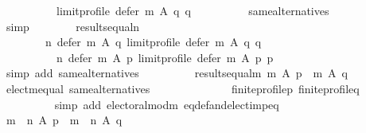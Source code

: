 \begin{isabellebody}
\ \ \ \ \ \ \ \ \ \ limit{\isacharunderscore}{\kern0pt}profile\ {\isacharparenleft}{\kern0pt}defer\ m\ A\ q{\isacharparenright}{\kern0pt}\ q{\isachardoublequoteclose}\isanewline
\ \ \ \ \ \ \ \ \isamarkupfalse%
\ same{\isacharunderscore}{\kern0pt}alternatives\isanewline
\ \ \ \ \ \ \ \ \isamarkupfalse%
\ simp\isanewline
\ \ \ \ \ \ \isamarkupfalse%
\ results{\isacharunderscore}{\kern0pt}equal{\isacharunderscore}{\kern0pt}n{\isacharcolon}{\kern0pt}\isanewline
\ \ \ \ \ \ \ \ {\isachardoublequoteopen}n\ {\isacharparenleft}{\kern0pt}defer\ m\ A\ q{\isacharparenright}{\kern0pt}\ {\isacharparenleft}{\kern0pt}limit{\isacharunderscore}{\kern0pt}profile\ {\isacharparenleft}{\kern0pt}defer\ m\ A\ q{\isacharparenright}{\kern0pt}\ q{\isacharparenright}{\kern0pt}\ {\isacharequal}{\kern0pt}\isanewline
\ \ \ \ \ \ \ \ \ \ n\ {\isacharparenleft}{\kern0pt}defer\ m\ A\ p{\isacharparenright}{\kern0pt}\ {\isacharparenleft}{\kern0pt}limit{\isacharunderscore}{\kern0pt}profile\ {\isacharparenleft}{\kern0pt}defer\ m\ A\ p{\isacharparenright}{\kern0pt}\ p{\isacharparenright}{\kern0pt}{\isachardoublequoteclose}\isanewline
\ \ \ \ \ \ \ \ \isamarkupfalse%
\ {\isacharparenleft}{\kern0pt}simp\ add{\isacharcolon}{\kern0pt}\ same{\isacharunderscore}{\kern0pt}alternatives{\isacharparenright}{\kern0pt}\isanewline
\ \ \ \ \ \ \isamarkupfalse%
\ \isamarkupfalse%
\ results{\isacharunderscore}{\kern0pt}equal{\isacharunderscore}{\kern0pt}m{\isacharcolon}{\kern0pt}\ {\isachardoublequoteopen}m\ A\ p\ {\isacharequal}{\kern0pt}\ m\ A\ q{\isachardoublequoteclose}\isanewline
\ \ \ \ \ \ \ \ \isamarkupfalse%
\ elect{\isacharunderscore}{\kern0pt}m{\isacharunderscore}{\kern0pt}equal\ same{\isacharunderscore}{\kern0pt}alternatives\isanewline
\ \ \ \ \ \ \ \ \ \ \ \ \ \ finite{\isacharunderscore}{\kern0pt}profile{\isacharunderscore}{\kern0pt}p\ finite{\isacharunderscore}{\kern0pt}profile{\isacharunderscore}{\kern0pt}q\isanewline
\ \ \ \ \ \ \ \ \isamarkupfalse%
\ {\isacharparenleft}{\kern0pt}simp\ add{\isacharcolon}{\kern0pt}\ electoral{\isacharunderscore}{\kern0pt}mod{\isacharunderscore}{\kern0pt}m\ eq{\isacharunderscore}{\kern0pt}def{\isacharunderscore}{\kern0pt}and{\isacharunderscore}{\kern0pt}elect{\isacharunderscore}{\kern0pt}imp{\isacharunderscore}{\kern0pt}eq{\isacharparenright}{\kern0pt}\isanewline
\ \ \ \ \ \ \isamarkupfalse%
\ {\isachardoublequoteopen}{\isacharparenleft}{\kern0pt}m\ {\isasymtriangleright}\ n{\isacharparenright}{\kern0pt}\ A\ p\ {\isacharequal}{\kern0pt}\ {\isacharparenleft}{\kern0pt}m\ {\isasymtriangleright}\ n{\isacharparenright}{\kern0pt}\ A\ q{\isachardoublequoteclose}\isanewline

\end{isabellebody}
